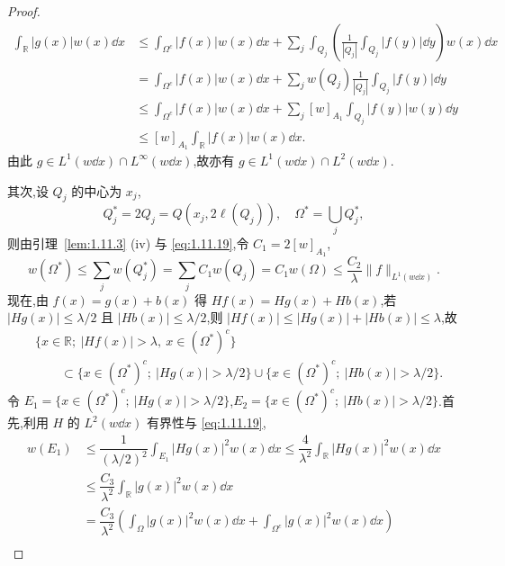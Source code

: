 \begin{proof}
\begin{align*}
\displaystyle\int_{\mathbb{R}}|g(x)|w(x)\dd x&\leq \displaystyle\int_{\Omega^{c}}|f(x)|w(x)\dd x + \sum_{j}\int_{Q_{j}}\left(\frac{1}{|Q_{j}|}\int_{Q_{j}}|f(y)|\dd y\right)w(x)\dd x  \\
&= \displaystyle\int_{\Omega^{c}}|f(x)|w(x)\dd x + \sum_{j}w(Q_{j})\frac{1}{|Q_{j}|}\int_{Q_{j}}|f(y)|\dd y \\
&\leq \displaystyle\int_{\Omega^{c}}|f(x)|w(x)\dd x + \sum_{j}[w]_{A_{1}}\int_{Q_{j}}|f(y)|w(y)\dd y \\
&\leq [w]_{A_{1}}\displaystyle\int_{\mathbb{R}}|f(x)|w(x)\dd x.
\end{align*}
由此 $g \in L^{1}(w\dd x) \cap L^{\infty}(w\dd x)$,故亦有 $g \in L^{1}(w\dd x) \cap L^{2}(w\dd x)$.

其次,设 $Q_{j}$ 的中心为 $x_{j}$,
\begin{equation*}
Q_{j}^{*} = 2Q_{j} = Q(x_{j}, 2\ell(Q_{j})), \quad \Omega^{*} = \bigcup_{j}Q_{j}^{*},
\end{equation*}
则由引理~\ref{lem:1.11.3} (iv) 与 \eqref{eq:1.11.19},令 $C_{1} = 2[w]_{A_{1}}$,
\begin{equation}\tag{1.11.20}
w(\Omega^{*}) \leq \sum_{j}w(Q_{j}^{*}) = \sum_{j}C_{1}w(Q_{j}) = C_{1}w(\Omega) \leq \frac{C_{2}}{\lambda}\| f \|_{L^{1}(w\dd x)}.
\label{eq:1.11.20}\end{equation}
现在,由 $f(x) = g(x) + b(x)$ 得 $Hf(x) = Hg(x) + Hb(x)$,若 $|Hg(x)| \leq \lambda/2$ 且 $|Hb(x)| \leq \lambda/2$,则 $|Hf(x)| \leq |Hg(x)| + |Hb(x)| \leq \lambda$,故
\begin{align*}
& \{x \in \mathbb{R};\ |Hf(x)| > \lambda,\ x \in (\Omega^{*})^{c}\} \\
& \qquad \subset \{x \in (\Omega^{*})^{c};\ |Hg(x)| > \lambda/2\} \cup \{x \in (\Omega^{*})^{c};\ |Hb(x)| > \lambda/2\}.
\end{align*}
令 $E_{1} = \{x \in (\Omega^{*})^{c};\ |Hg(x)| > \lambda/2\}$,$E_{2} = \{x \in (\Omega^{*})^{c};\ |Hb(x)| > \lambda/2\}$.首先,利用 $H$ 的 $L^{2}(w\dd x)$ 有界性与 \eqref{eq:1.11.19},
\begin{equation}\tag{1.11.21}\begin{aligned}
w(E_{1}) &\leq \dfrac{1}{(\lambda/2)^{2}}\displaystyle\int_{E_{1}}|Hg(x)|^{2}w(x)\dd x \leq \dfrac{4}{\lambda^{2}}\int_{\mathbb{R}}|Hg(x)|^{2}w(x)\dd x \\
&\leq \dfrac{C_{3}}{\lambda^{2}}\displaystyle\int_{\mathbb{R}}|g(x)|^{2}w(x)\dd x \\
&= \dfrac{C_{3}}{\lambda^{2}}\left(\displaystyle\int_{\Omega}|g(x)|^{2}w(x)\dd x + \int_{\Omega^{c}}|g(x)|^{2}w(x)\dd x\right) \\

\end{aligned}
\end{equation}
\end{proof}
